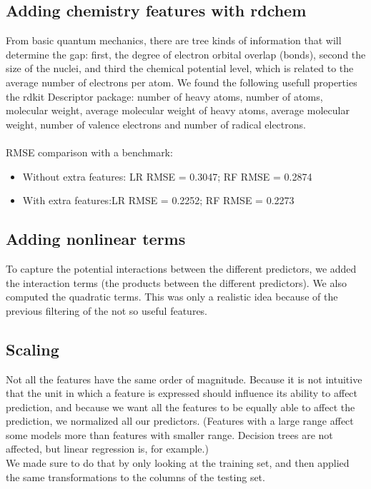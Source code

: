 \documentclass[11pt]{article}
\begin{document}
  \subsection{Adding chemistry features with rdchem}
From basic quantum mechanics, there are tree kinds of information that will determine the gap: first, the degree of electron orbital overlap (bonds), second the size of the nuclei, and third the chemical potential level, which is related to the average number of electrons per atom. We found the following usefull properties the rdkit Descriptor package: number of heavy atoms, number of atoms, molecular weight, average molecular weight of heavy atoms, average molecular weight, number of valence electrons and number of radical electrons.
\\\\
RMSE comparison with a benchmark: 
\begin{itemize}
\item{Without extra features: LR RMSE = 0.3047;  RF RMSE = 0.2874}
\item{With extra features:LR RMSE = 0.2252;  RF RMSE = 0.2273}
\end{itemize}

  \subsection{Adding nonlinear terms}
  
    To capture the potential interactions between the different predictors, we added the interaction terms (the products between the
    different predictors). We also computed the quadratic terms.
    This was only a realistic idea because of the previous filtering of the not so useful features.
    
    \subsection{Scaling}
    Not all the features have the same order of magnitude. Because it is not intuitive that the unit in which a feature is expressed
    should influence its ability to affect prediction, and because we want all the features to be equally able to affect the prediction,
    we normalized all our predictors. (Features with a large range affect some models more than features with smaller range. Decision trees
    are not affected, but linear regression is, for example.) \\
    We made sure to do that by only looking at the training set, and then applied the same transformations to the columns of the testing set.
    
\end{document}
